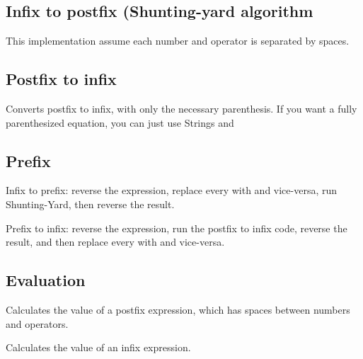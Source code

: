 
\subsection*{Infix to postfix (Shunting-yard algorithm}

This implementation assume each number and operator is separated by spaces.



\subsection*{Postfix to infix}

Converts postfix to infix, with only the necessary parenthesis. If you want a fully parenthesized equation, you can just use Strings and 



\subsection*{Prefix}

Infix to prefix: reverse the expression, replace every  with  and vice-versa, run Shunting-Yard, then reverse the result.

Prefix to infix: reverse the expression, run the postfix to infix code, reverse the result, and then replace every  with  and vice-versa.

\subsection*{Evaluation}

Calculates the value of a postfix expression, which has spaces between numbers and operators.



Calculates the value of an infix expression.



\newpage
